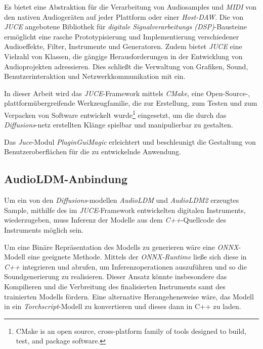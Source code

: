 \documentclass[
  a4paper,  %
  twoside,  %
  bibliography=totoc,
  headsepline,
  cleardoublepage=empty,
  parskip=half,
  draft=false
]{scrbook}
\begin{document}
{Es bietet eine Abstraktion für die Verarbeitung von Audiosamples und \emph{MIDI} von den nativen Audiogeräten auf jeder Plattform oder einer \emph{Host-DAW}. Die von \emph{JUCE} angebotene Bibliothek für \emph{digitale Signalverarbeitungs (DSP)}-Bausteine ermöglicht eine rasche Prototypisierung und Implementierung verschiedener Audioeffekte, Filter, Instrumente und Generatoren. \cite{noauthor_juce_nodate} Zudem bietet \emph{JUCE} eine Vielzahl von Klassen, die gängige Herausforderungen in der Entwicklung von Audioprojekten adressieren. Dies schließt die Verwaltung von Grafiken, Sound, Benutzerinteraktion und Netzwerkkommunikation mit ein. \cite{robinson_getting_2013}

In dieser Arbeit wird das \emph{JUCE}-Framework mittels \emph{CMake}, \glqq eine Open-Source-, plattformübergreifende Werkzeugfamilie, die zur Erstellung, zum Testen und zum Verpacken von Software entwickelt wurde\grqq \footnote{CMake is an open source, cross-platform family of tools designed to build, test, and package software.} \cite{noauthor_cmake_nodate} eingesetzt, um die durch das \emph{Diffusions}-netz erstellten Klänge spielbar und manipulierbar zu gestalten. 

Das \emph{Juce}-Modul \emph{PluginGuiMagic} \cite{walz_plugin_nodate} erleichtert und beschleunigt die Gestaltung von Benutzeroberflächen für die zu entwickelnde Anwendung.

\subsection{AudioLDM-Anbindung} \label{sec:api}
Um ein von den \emph{Diffusions}-modellen \emph{AudioLDM} und \emph{AudioLDM2} erzeugtes Sample, mithilfe des im \emph{JUCE}-Framework entwickelten digitalen Instruments, wiederzugeben, muss Inferenz der Modelle aus dem \emph{C++}-Quellcode des Instruments möglich sein.

Um eine Binäre Repräsentation des Modells zu generieren wäre eine \emph{ONNX}-Modell \cite{noauthor_onnx_nodate} eine geeignete Methode. Mittels der \emph{ONNX-Runtime} \cite{noauthor_onnx-runtime_nodate} ließe sich diese in \emph{C++} integrieren und abrufen, um Inferenzoperationen auszuführen und so die Soundgenerierung zu realisieren. Dieser Ansatz könnte insbesondere das Kompilieren und die Verbreitung des finalisierten Instruments samt des trainierten Modells fördern. Eine alternative Herangehensweise wäre, das Modell in ein \emph{Torchscript}-Modell \cite{noauthor_torchscript_nodate} zu konvertieren und dieses dann in C++ zu laden. \cite{oli_larkin_machine_2023}

}
\end{document}
